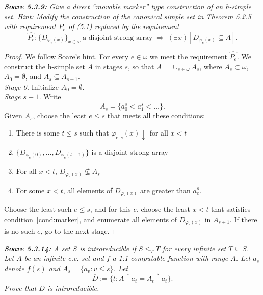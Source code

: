 \documentclass{article}
\begin{document}
\it \textbf{Soare 5.3.9:} Give a direct ``movable marker'' type
  construction of an h-simple set. Hint: Modify the construction of the
  canonical simple set in Theorem 5.2.5 with requirement $P_e$ of (5.1)
  replaced by the requirement
  \[\hat{P_e}: \{D_{\varphi_e(x)}\}_{x\in\omega}\; \text{a disjoint strong
  array}\; \Rightarrow\; (\exists x)[D_{\varphi_e(x)} \subseteq A].\]

  \begin{proof}
    We follow Soare's hint. For every $e\in\omega$ we meet the requirement
    $\hat{P_e}$. We construct the h-simple set $A$ in stages $s$, so that
    $A=\cup_{s\in\omega} A_s$, where $A_s\subset\omega$, $A_0=\emptyset$,
    and $A_s\subseteq A_{s+1}$. \\

    \textit{Stage 0.} Initialize $A_0=\emptyset$. \\

    \textit{Stage $s+1$.} Write
    \[\overline{A_s}=\{a_0^s<a_1^s<\ldots\}.\]
    Given $A_s$, choose the least $e\leq s$ that meets all these
    conditions:

    \begin{enumerate}[label={(\roman*)}]
      \item There is some $t\leq s$ such that $\varphi_{e,s}(x)\downarrow$
        for all $x<t$
      \item $\{D_{\varphi_{e}(0)}, \ldots, D_{\varphi_{e}(t-1)}\}$ is a
        disjoint strong array
      \item For all $x<t$, $D_{\varphi_{e}(x)}\not\subseteq A_s$
      \item For some $x<t$, all elements of $D_{\varphi_{e}(x)}$ are
        greater than $a_e^s$.
        \label{cond:marker}
    \end{enumerate}

    Choose the least such $e\leq s$, and for this $e$, choose the least
    $x<t$ that satisfies condition~\ref{cond:marker}, and enumerate
    all elements of $D_{\varphi_{e}(x)}$ in $A_{s+1}$. If there is no such
    $e$, go to the next stage.
  \end{proof}

\it \textbf{Soare 5.3.14:} A set $S$ is introreducible if $S\leq_T T$ for
  every infinite set $T\subseteq S$. Let $A$ be an infinite c.c. set and
  $f$ a 1:1 computable function with range $A$. Let $a_s$ denote $f(s)$ and
  $A_s=\{a_v:v\leq s\}$. Let
  \[\overline{D} :=\{t: A\restriction a_t =A_t\restriction a_t\}.\]
  Prove that $\overline{D}$ is introreducible.
\end{document}
